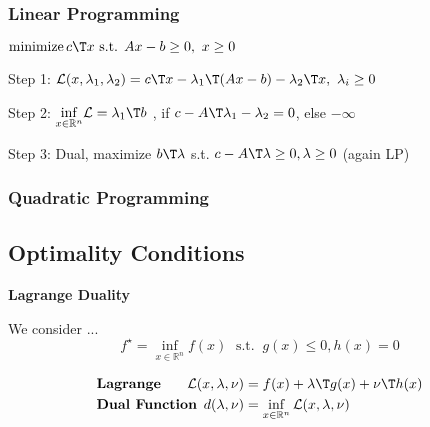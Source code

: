 

\subsubsection{Linear Programming}
$ \operatorname{minimize} c\T x
	\text{ s.t. } Ax-b \ge 0,\ x\ge0$

Step 1:
$\mathcal{L}(x,\lambda_1,\lambda_2) =
	c\T x-\lambda_1\T (Ax-b) -\lambda_2\T x,\ \lambda_i \ge0$

Step 2:
$\underset{x \in \mathcal{\mathbb{R}}^n}{\operatorname{inf}}
	\mathcal{L}=\lambda_1\T b$
, if $c-A\T\lambda_1-\lambda_2=0$, else $-\infty$

Step 3: Dual,
maximize $b\T\lambda$
s.t.
$c-A\T\lambda\ge0,\lambda\ge0$
(again LP)

\subsubsection{Quadratic Programming}

\subsection{Optimality Conditions}

\begin{sstTitleBox}{\textbf{\large
			Lagrange Duality
		}}
	\begin{centering}
		We consider ...
		\small
		\begin{equation}
			f^\star = \inf_{x\in\mathcal{\mathbb{R}}^n}f(x)
			\;\text{ s.t. }\ g(x)\le0,h(x)=0
			\label{eq:dual}
		\end{equation}

		\begin{sstFrame}
			{\color{white}
				\vspace{-3mm}
				\[\begin{aligned}
						 & \textbf{Lagrange}      & \hspace{-6mm}	\mathcal{L}(x,\lambda,\nu) & = f(x) + \lambda\T g(x)+\nu\T h(x)
						\\
						 & \textbf{Dual Function} & \hspace{-6mm}		d(\lambda,\nu)            & = \inf_{x \in \mathcal{\mathbb{R}}^n}\mathcal{L}(x,\lambda,\nu)
					\end{aligned}\]
				\vspace{-4mm}
			}
		\end{sstFrame}
	\end{centering}
\end{sstTitleBox}

